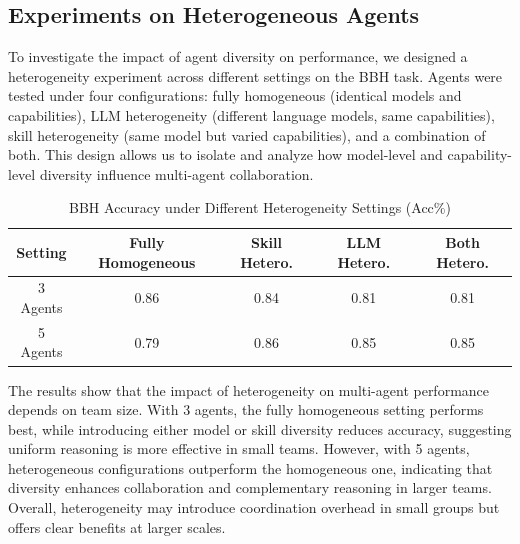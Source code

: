 \documentclass{article}
\begin{document}
\subsection{Experiments on Heterogeneous Agents}
To investigate the impact of agent diversity on performance, we designed a heterogeneity experiment across different settings on the BBH task. Agents were tested under four configurations: fully homogeneous (identical models and capabilities), LLM heterogeneity (different language models, same capabilities), skill heterogeneity (same model but varied capabilities), and a combination of both. This design allows us to isolate and analyze how model-level and capability-level diversity influence multi-agent collaboration.
\vspace{-0.2cm}

\begin{table}[h]
\centering
\caption{BBH Accuracy under Different Heterogeneity Settings (Acc\%)}
\vspace{+0.1cm}
\label{tab:heterogeneity}
\renewcommand{\arraystretch}{1.3}
{}
\begin{tabular}{c|c|c|c|c}
\hline
\rowcolor{lightgray}
\textbf{Setting} & \textbf{Fully Homogeneous} & \textbf{Skill Hetero.} & \textbf{LLM Hetero.} & \textbf{Both Hetero.} \\
\hline
3 Agents & 0.86 & 0.84 & 0.81 & 0.81\\
\hline
5 Agents & 0.79 & 0.86 & 0.85 & 0.85 \\
\hline
\end{tabular}
\end{table}

The results show that the impact of heterogeneity on multi-agent performance depends on team size. With 3 agents, the fully homogeneous setting performs best, while introducing either model or skill diversity reduces accuracy, suggesting uniform reasoning is more effective in small teams. However, with 5 agents, heterogeneous configurations outperform the homogeneous one, indicating that diversity enhances collaboration and complementary reasoning in larger teams. Overall, heterogeneity may introduce coordination overhead in small groups but offers clear benefits at larger scales.
\end{document}
